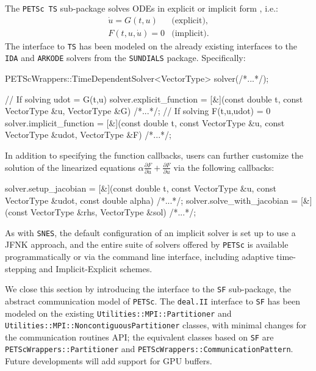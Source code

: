 \documentclass{ansarticle-preprint}
\newcommand{\specialword}[1]{\texttt{#1}}
\newcommand{\dealii}{{\specialword{deal.II}}\xspace}
\newcommand{\petsc}{\specialword{PETSc}\xspace}
\newcommand{\snes}{{\specialword{SNES}}\xspace}
\newcommand{\ts}{{\specialword{TS}}\xspace}
\newcommand{\petscsf}{{\specialword{SF}}\xspace}
\newcommand{\sundials}{{\specialword{SUNDIALS}}\xspace}
\newcommand{\ida}{{\specialword{IDA}}\xspace}
\newcommand{\arkode}{{\specialword{ARKODE}}\xspace}
\begin{document}
The \petsc~\ts sub-package solves ODEs in explicit or implicit form \cite{abhyankar2018petsc}, i.e.:
\begin{eqnarray*}
\dot{u} = G(t,u) &\text{(explicit)},\\
F(t,u,\dot{u}) = 0 &\text{(implicit)}.
\end{eqnarray*}
The interface to \ts has been modeled on the already existing interfaces
to the \ida and \arkode solvers from the \sundials package. Specifically:
\begin{c++}
PETScWrappers::TimeDependentSolver<VectorType> solver(/*...*/);

// If solving udot = G(t,u)
solver.explicit_function = [&](const double     t,
                               const VectorType &u,
                               VectorType       &G) {/*...*/};
// If solving F(t,u,udot) = 0
solver.implicit_function = [&](const double     t,
                               const VectorType &u,
                               const VectorType &udot,
                               VectorType       &F) {/*...*/};
\end{c++}
In addition to specifying the function callbacks, users can further customize
the solution of the linearized equations $\alpha \frac{\partial{F}}{\partial{\dot{u}}} + \frac{\partial{F}}{\partial{u}}$
via the following callbacks:
\begin{c++}
solver.setup_jacobian = [&](const double     t,
                            const VectorType &u,
                            const VectorType &udot,
                            const double     alpha) {/*...*/};
solver.solve_with_jacobian = [&](const VectorType &rhs,
                                 VectorType       &sol) {/*...*/};
\end{c++}
As with \snes, the default configuration of an implicit solver is set up to
use a JFNK approach, and the entire suite of solvers offered by \petsc is available
programmatically or via the command line interface,
including adaptive time-stepping and Implicit-Explicit schemes.

We close this section by introducing the interface to the \petscsf sub-package,
the abstract communication model of \petsc. The \dealii interface to
\petscsf has been modeled on the existing \texttt{Utilities::MPI::Partitioner} and
\texttt{Utilities::MPI::NoncontiguousPartitioner} classes, with minimal changes for the
communication routines API; the equivalent classes based
on \petscsf are \texttt{PETScWrappers::Partitioner} and
\texttt{PETScWrappers::CommunicationPattern}.
Future developments will add support for GPU buffers.
\end{document}
